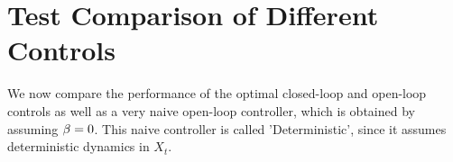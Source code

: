 \documentclass{article}
\begin{document}
% 


\section{Test Comparison of Different Controls}
\label{sec:probabilistic_numerical_test}
We now compare the performance of the optimal closed-loop and open-loop controls
as well as a very naive open-loop controller, which is obtained by assuming
${\beta}=0$. This naive controller is called 'Deterministic', since it assumes
deterministic dynamics in $X_t$. 
\end{document}
